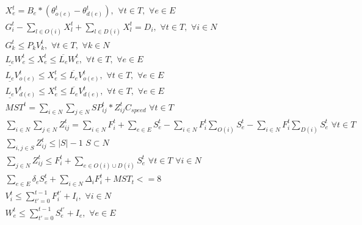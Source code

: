 \documentclass[10pt]{article}
\begin{document}
\begin{eqnarray}
 X_e^t = B_e * (\theta_{o(e)}^t - \theta_{d(e)}^t), \hspace{5pt} \forall t \in T, \hspace{4pt} \forall e \in E\\
 G_i^t - \sum_{l \in O(i)} X_l^t + \sum_{l \in D(i)} X_l^t = D_i, \hspace{4pt} \forall t \in T, \hspace{4pt} \forall i \in N\\
 G_k^t \leq P_{k} V_{k}^t, \hspace{4pt} \forall t \in T, \hspace{4pt} \forall k \in N\\
 \underline{L_e}W_{e}^t \leq X_{e}^t \leq \overline{L_e}W_{e}^t, \hspace{4pt} \forall t \in T, \hspace{4pt} \forall e \in E\\
 \underline{L_e}V_{o(e)}^t \leq X_{e}^t \leq \overline{L_e}V_{o(e)}^t, \hspace{4pt} \forall t \in T, \hspace{4pt} \forall e \in E\\
 \underline{L_e}V_{d(e)}^t \leq X_{e}^t \leq \overline{L_e}V_{d(e)}^t, \hspace{4pt} \forall t \in T, \hspace{4pt} \forall e \in E\\
 MST^t = \sum_{i \in N} \sum_{j \in N} SP_{ij}^t*Z_{ij}^{t} C_{speed}\hspace{4pt} \forall t \in T\\
 \sum_{i \in N} \sum_{j \in N} Z_{ij}^{t} = \sum_{i \in N} F_i^t + \sum_{e \in E} S_e^t - \sum_{i \in N} F_i^t \sum_{O(i)} S_e^t - \sum_{i \in N} F_i^t \sum_{D(i)} S_e^t \hspace{4pt} \forall t \in T\\
 \sum_{i,j \in S} Z_{ij}^t \leq |S|-1 \hspace{4pt} S\subset N\\
 \sum_{j \in N} Z_{ij}^t \leq F_i^t + \sum_{e \in O(i) \cup D(i)} S_{e}^t \hspace{4pt} \forall t \in T\hspace{4pt} \forall i \in N \\
 \sum_{e \in E} \delta_{e}S_e^t + \sum_{i \in N}\Delta_{i}F_i^t + MST_t <=8\\
 V_i^t \leq \sum_{t'=0}^{t-1} F_i^{t'}+I_i, \hspace{4pt} \forall i \in N\\
 W_{e}^t \leq \sum_{t'=0}^{t-1} S_{e}^{t'}+I_e, \hspace{4pt} \forall e \in E
 \end{eqnarray}
\end{document}
